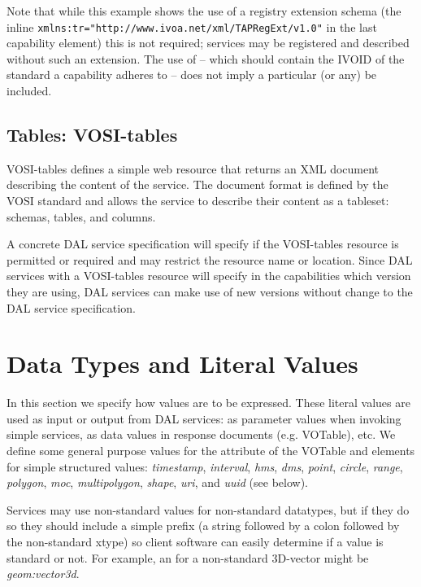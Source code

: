 \documentclass[11pt,letter]{ivoa}
\begin{document}
Note that while this example shows the use of a registry extension schema (the
inline \verb|xmlns:tr="http://www.ivoa.net/xml/TAPRegExt/v1.0"| in the last capability
element) this is not required; services may be registered and described without
such an extension. The use of  -- which should contain the
IVOID of
the standard a capability adheres to -- does not imply a particular (or any)
 be included.

\subsection{Tables: VOSI-tables}
\label{sec:vosi-tables}
VOSI-tables \citep{2017ivoa.spec.0524G} defines a simple web resource that returns an
XML document
describing the content of the service. The document format is defined by the
VOSI \citep{2017ivoa.spec.0524G} standard and allows the service to
describe their content
as a tableset: schemas, tables, and columns.

A concrete DAL service specification will specify if the VOSI-tables resource is
permitted or required and may restrict the resource name or location.
Since DAL services with a VOSI-tables resource will specify
in the capabilities which version they are using, DAL services can make use of
new versions without change to the DAL service specification.

\section{Data Types and Literal Values}
\label{sec:xtypes}
In this section we specify how values are to be expressed. These literal values
are used as input or output from DAL services: as parameter values when
invoking simple services, as data values in response documents (e.g. VOTable),
etc. We define some general purpose values for the  attribute of
the VOTable  and  elements  for simple
structured values: \emph{timestamp}, \emph{interval},
\emph{hms}, \emph{dms},
\emph{point}, \emph{circle}, \emph{range}, \emph{polygon}, \emph{moc},
\emph{multipolygon}, \emph{shape}, \emph{uri}, and \emph{uuid} (see below).

Services may use non-standard  values for non-standard datatypes, but if they
do so they should include a simple prefix (a string followed by a colon
followed by the non-standard xtype) so client software can easily determine
if a value is standard or not. For example, an  for a
non-standard 3D-vector might be \emph{geom:vector3d}.
\end{document}
